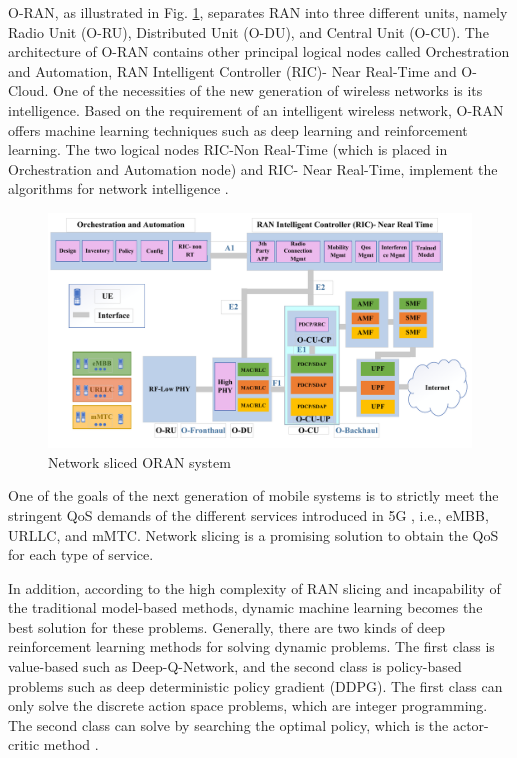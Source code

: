 \documentclass{article}
\begin{document}
O-RAN, as illustrated in Fig. \ref{fig:c11}, separates RAN into three different units, namely Radio Unit (O-RU), Distributed Unit (O-DU), and Central Unit (O-CU).
The architecture of O-RAN contains other principal logical nodes called Orchestration and Automation,
RAN Intelligent Controller (RIC)- Near Real-Time and O-Cloud. 
One of the necessities of the new generation of wireless networks is its intelligence.
Based on the requirement of an intelligent wireless network, O-RAN offers machine learning techniques such as deep learning and reinforcement learning. The two logical nodes RIC-Non Real-Time (which is placed in Orchestration and Automation node) and RIC- Near Real-Time, implement the algorithms for network intelligence
\cite{niknam2020intelligent,ORANArch,ORANML}.
\begin{figure}
  \centering 
    \includegraphics[scale = 0.5]{finalDraw.pdf}
  \caption{Network sliced ORAN system}
  \label{fig:c11}
\end{figure}


One of the goals of the next generation of mobile systems is to strictly meet the stringent QoS demands of the different services introduced in 5G , i.e., eMBB, URLLC, and mMTC. Network slicing is a promising solution to obtain the QoS for each type of service. 

In addition, according to the high complexity of RAN slicing and incapability of the traditional model-based methods, dynamic machine learning becomes the best solution for these problems.
 Generally, there are two kinds of deep reinforcement learning methods for solving dynamic problems. The first class is value-based such as Deep-Q-Network, and the second class is policy-based problems such as
deep deterministic policy gradient (DDPG). The first class can only solve the discrete action space problems, which are integer programming. The second class can solve by searching the optimal policy, which is the actor-critic method \cite{alsenwi2021intelligent,yan2019intelligent,mei2021intelligent}.
\end{document}
